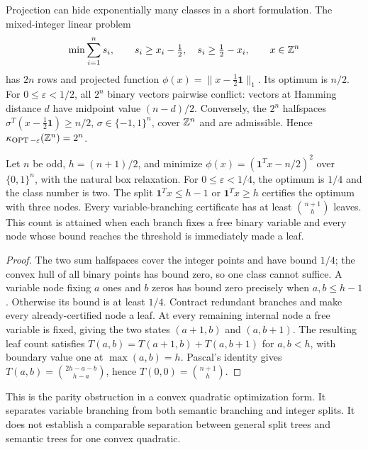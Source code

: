 Projection can hide exponentially many classes in a short formulation.
The mixed-integer linear problem
\begin{equation*}
 \min\sum_{i=1}^n s_i,
 \qquad s_i\ge x_i-\tfrac12,\quad s_i\ge\tfrac12-x_i,
 \qquad x\in\mathbb{Z}^n
\end{equation*}
has $2n$ rows and projected function
$\phi(x)=\|x-\tfrac12\mathbf1\|_1$. Its optimum is $n/2$. For
$0\le\varepsilon<1/2$, all $2^n$ binary vectors pairwise conflict: vectors
at Hamming distance $d$ have midpoint value $(n-d)/2$.
Conversely, the $2^n$ halfspaces
$\sigma^T(x-\tfrac12\mathbf1)\ge n/2$, $\sigma\in\{-1,1\}^n$, cover
$\mathbb{Z}^n$ and are admissible. Hence $\kappa_{\operatorname{OPT}-\varepsilon}(\mathbb{Z}^n)=2^n$.

\begin{proposition}
\label{lattice:jeroslow}
Let $n$ be odd, $h=(n+1)/2$, and minimize
$\phi(x)=(\mathbf1^Tx-n/2)^2$ over $\{0,1\}^n$, with the natural box
relaxation. For $0\le\varepsilon<1/4$, the optimum is $1/4$ and the class
number is two. The split
$\mathbf1^Tx\le h-1$ or $\mathbf1^Tx\ge h$ certifies the optimum with
three nodes. Every variable-branching certificate has at least
$\binom{n+1}{h}$ leaves. This count is attained when each branch fixes a
free binary variable and every node whose bound reaches the threshold is
immediately made a leaf.
\end{proposition}

\begin{proof}
The two sum halfspaces cover the integer points and have bound $1/4$;
the convex hull of all binary points has bound zero, so one class cannot
suffice. A variable node fixing $a$ ones and $b$ zeros has bound zero
precisely when $a,b\le h-1$. Otherwise its bound is at least $1/4$.
Contract redundant branches and make every already-certified node a leaf.
At every remaining internal node a free variable is fixed, giving the two
states $(a+1,b)$ and $(a,b+1)$. The resulting leaf count satisfies
$T(a,b)=T(a+1,b)+T(a,b+1)$ for $a,b<h$, with boundary value one at
$\max(a,b)=h$. Pascal's identity gives
$T(a,b)=\binom{2h-a-b}{h-a}$, hence $T(0,0)=\binom{n+1}{h}$.
\end{proof}

This is the parity obstruction in a convex quadratic optimization form.
It separates variable branching from both semantic branching and integer
splits. It does not establish a comparable separation between general
split trees and semantic trees for one convex quadratic.

